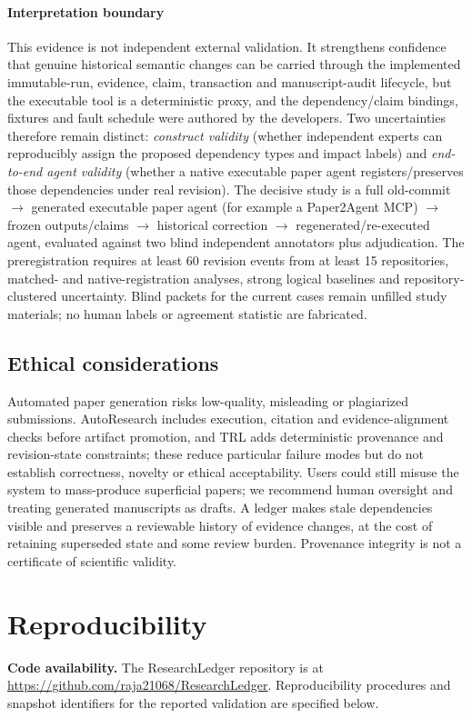 \documentclass[journal]{IEEEtran}
\begin{document}
\paragraph{Interpretation boundary} This evidence is not independent external validation. It strengthens confidence that genuine historical semantic changes can be carried through the implemented immutable-run, evidence, claim, transaction and manuscript-audit lifecycle, but the executable tool is a deterministic proxy, and the dependency/claim bindings, fixtures and fault schedule were authored by the developers. Two uncertainties therefore remain distinct: \emph{construct validity} (whether independent experts can reproducibly assign the proposed dependency types and impact labels) and \emph{end-to-end agent validity} (whether a native executable paper agent registers/preserves those dependencies under real revision). The decisive study is a full old-commit $\to$ generated executable paper agent (for example a Paper2Agent MCP) $\to$ frozen outputs/claims $\to$ historical correction $\to$ regenerated/re-executed agent, evaluated against two blind independent annotators plus adjudication. The preregistration requires at least 60 revision events from at least 15 repositories, matched- and native-registration analyses, strong logical baselines and repository-clustered uncertainty. Blind packets for the current cases remain unfilled study materials; no human labels or agreement statistic are fabricated.

\subsection{Ethical considerations}
Automated paper generation risks low-quality, misleading or plagiarized submissions. AutoResearch includes execution, citation and evidence-alignment checks before artifact promotion, and TRL adds deterministic provenance and revision-state constraints; these reduce particular failure modes but do not establish correctness, novelty or ethical acceptability. Users could still misuse the system to mass-produce superficial papers; we recommend human oversight and treating generated manuscripts as drafts. A ledger makes stale dependencies visible and preserves a reviewable history of evidence changes, at the cost of retaining superseded state and some review burden. Provenance integrity is not a certificate of scientific validity.

\section{Reproducibility}
\noindent\textbf{Code availability.} The ResearchLedger repository is at \url{https://github.com/raja21068/ResearchLedger}. Reproducibility procedures and snapshot identifiers for the reported validation are specified below.
\end{document}
